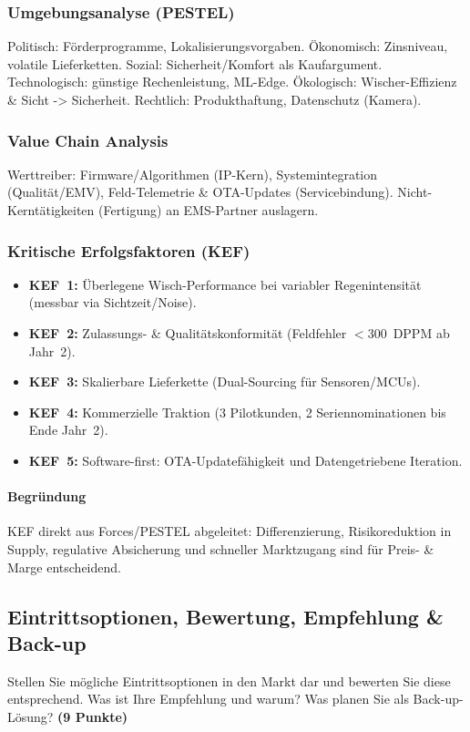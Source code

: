 \documentclass[
%
ngerman %
%
numeric %
]{wbh-assignment}
\begin{document}
\subsubsection{Umgebungsanalyse (PESTEL)}
Politisch: Förderprogramme, Lokalisierungsvorgaben. Ökonomisch: Zinsniveau, volatile Lieferketten. Sozial: Sicherheit/Komfort als Kaufargument. Technologisch: günstige Rechenleistung, ML-Edge. Ökologisch: Wischer-Effizienz \& Sicht -> Sicherheit. Rechtlich: Produkthaftung, Datenschutz (Kamera).

\subsubsection{Value Chain Analysis}
Werttreiber: Firmware/Algorithmen (IP-Kern), Systemintegration (Qualität/EMV), Feld-Telemetrie \& OTA-Updates (Servicebindung). Nicht-Kerntätigkeiten (Fertigung) an EMS-Partner auslagern.

\subsubsection{Kritische Erfolgsfaktoren (KEF)}
\begin{itemize}
  \item \textbf{KEF~1:} Überlegene Wisch-Performance bei variabler Regenintensität (messbar via Sichtzeit/Noise).
  \item \textbf{KEF~2:} Zulassungs- \& Qualitätskonformität (Feldfehler $<300$~DPPM ab Jahr~2).
  \item \textbf{KEF~3:} Skalierbare Lieferkette (Dual-Sourcing für Sensoren/MCUs).
  \item \textbf{KEF~4:} Kommerzielle Traktion (3 Pilotkunden, 2 Seriennominationen bis Ende Jahr~2).
  \item \textbf{KEF~5:} Software-first: OTA-Updatefähigkeit und Datengetriebene Iteration.
\end{itemize}

\paragraph{Begründung}
KEF direkt aus Forces/PESTEL abgeleitet: Differenzierung, Risikoreduktion in Supply, regulative Absicherung und schneller Marktzugang sind für Preis- \& Marge entscheidend.

\subsection{Eintrittsoptionen, Bewertung, Empfehlung \& Back-up}
\begin{aufgabenstellung}
Stellen Sie mögliche Eintrittsoptionen in den Markt dar und bewerten Sie diese entsprechend. Was ist Ihre Empfehlung und warum? Was planen Sie als Back-up-Lösung? \textbf{(9 Punkte)}
\end{aufgabenstellung}
\end{document}
